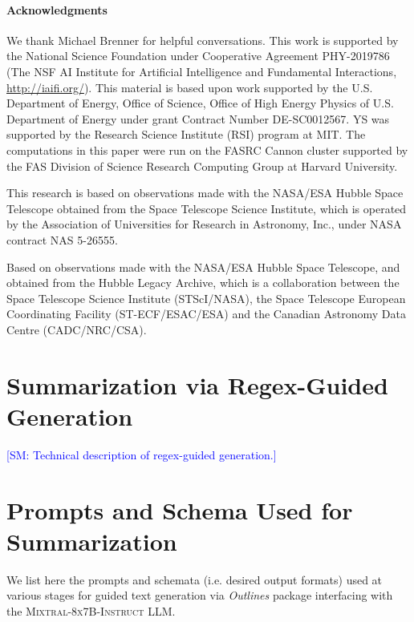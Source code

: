 \documentclass[10pt]{article} %
\newcommand{\package}[1]{\textsl{#1}\xspace}
\newcommand{\SM}[1]{\textcolor{blue}{[SM: #1]}}
\begin{document}
\paragraph*{Acknowledgments}

We thank Michael Brenner for helpful conversations.
%
This work is supported by the National Science Foundation under Cooperative Agreement PHY-2019786 (The NSF AI Institute for Artificial Intelligence and Fundamental Interactions, \url{http://iaifi.org/}).
%
This material is based upon work supported by the U.S. Department of Energy, Office of Science, Office of High Energy Physics of U.S. Department of Energy under grant Contract Number  DE-SC0012567. 
%
YS was supported by the Research Science Institute (RSI) program at MIT.
%
The computations in this paper were run on the FASRC Cannon cluster supported by the FAS Division of Science Research Computing Group at Harvard University.

This research is based on observations made with the NASA/ESA Hubble Space Telescope obtained from the Space Telescope Science Institute, which is operated by the Association of Universities for Research in Astronomy, Inc., under NASA contract NAS 5-26555.

Based on observations made with the NASA/ESA Hubble Space Telescope, and obtained from the Hubble Legacy Archive, which is a collaboration between the Space Telescope Science Institute (STScI/NASA), the Space Telescope European Coordinating Facility (ST-ECF/ESAC/ESA) and the Canadian Astronomy Data Centre (CADC/NRC/CSA).





\appendix
\section{Summarization via Regex-Guided Generation}
\label{app:guided-generation}

\SM{Technical description of regex-guided generation.}

\section{Prompts and Schema Used for Summarization}
\label{app:summarization}

We list here the prompts and schemata (i.e.
%
desired output formats) used at various stages for guided text generation via \package{Outlines} package interfacing with the \textsc{Mixtral-8x7B-Instruct} LLM.
\end{document}
